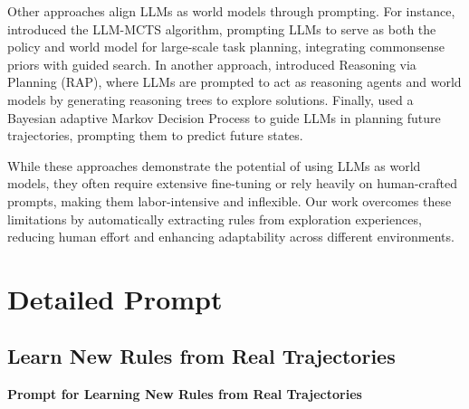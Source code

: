 \documentclass{article} %
\begin{document}
Other approaches align LLMs as world models through prompting. For instance, \cite{zhao2024large} introduced the LLM-MCTS algorithm, prompting LLMs to serve as both the policy and world model for large-scale task planning, integrating commonsense priors with guided search. In another approach, \cite{hao2023reasoning} introduced Reasoning via Planning (RAP), where LLMs are prompted to act as reasoning agents and world models by generating reasoning trees to explore solutions. Finally, \citep{liu2023reason} used a Bayesian adaptive Markov Decision Process to guide LLMs in planning future trajectories, prompting them to predict future states.

While these approaches demonstrate the potential of using LLMs as world models, they often require extensive fine-tuning or rely heavily on human-crafted prompts, making them labor-intensive and inflexible. Our work overcomes these limitations by automatically extracting rules from exploration experiences, reducing human effort and enhancing adaptability across different environments.



\section{Detailed Prompt}



\subsection{Learn New Rules from Real Trajectories}
\label{sec:Prompt for Learn New Rules from Real Trajectories}


\begin{center}
    \textbf{Prompt for Learning New Rules from Real Trajectories}
\end{center}
\end{document}
